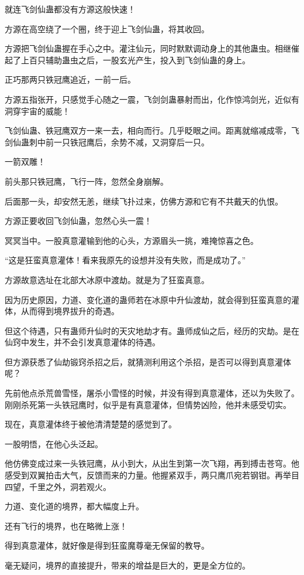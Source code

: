 \begin{this_body}
就连飞剑仙蛊都没有方源这般快速！

方源在高空绕了一个圈，终于迎上飞剑仙蛊，将其收回。

方源把飞剑仙蛊握在手心之中。灌注仙元，同时默默调动身上的其他蛊虫。相继催起了上百只辅助蛊虫之后，一股玄光产生，投入到飞剑仙蛊的身上。

正巧那两只铁冠鹰追近，一前一后。

方源五指张开，只感觉手心随之一震，飞剑剑蛊暴射而出，化作惊鸿剑光，近似有洞穿宇宙的威能！

飞剑仙蛊、铁冠鹰双方一来一去，相向而行。几乎眨眼之间。距离就缩减成零，飞剑仙蛊刺中前一只铁冠鹰后，余势不减，又洞穿后一只。

一箭双雕！

前头那只铁冠鹰，飞行一阵，忽然全身崩解。

后面那一头，却安然无恙，继续飞扑过来，仿佛方源和它有不共戴天的仇恨。

方源正要收回飞剑仙蛊，忽然心头一震！

冥冥当中。一股真意灌输到他的心头，方源眉头一挑，难掩惊喜之色。

“这是狂蛮真意灌体！看来我原先的设想并没有失败，而是成功了。”

方源故意选址在北部大冰原中渡劫。就是为了狂蛮真意。

因为历史原因，力道、变化道的蛊师若在冰原中升仙渡劫，就会得到狂蛮真意的灌体，从而得到境界拔升的奇遇。

但这个待遇，只有蛊师升仙时的天灾地劫才有。蛊师成仙之后，经历的灾劫。是在仙窍中发生，并不会引发真意灌体的待遇。

但方源获悉了仙劫锻窍杀招之后，就猜测利用这个杀招，是否可以得到真意灌体呢？

先前他点杀荒兽雪怪，屠杀小雪怪的时候，并没有得到真意灌体，还以为失败了。刚刚杀死第一头铁冠鹰时，似乎是有真意灌体，但情势凶险，他并未感受切实。

现在，真意灌体终于被他清清楚楚的感觉到了。

一股明悟，在他心头泛起。

他仿佛变成过来一头铁冠鹰，从小到大，从出生到第一次飞翔，再到搏击苍穹。他感受到双翼拍击大气，反馈而来的力量。他握紧双手，两只鹰爪宛若钢钳。再举目四望，千里之外，洞若观火。

力道、变化道的境界，都大幅度上升。

还有飞行的境界，也在略微上涨！

得到真意灌体，就好像是得到狂蛮魔尊毫无保留的教导。

毫无疑问，境界的直接提升，带来的增益是巨大的，更是全方位的。


\end{this_body}
